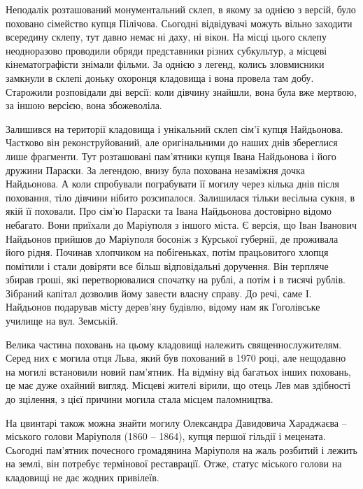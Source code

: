 
Неподалік розташований монументальний склеп, в якому за однією з версій, було
поховано сімейство купця Пілічова. Сьогодні відвідувачі можуть вільно заходити
всередину склепу, тут давно немає ні даху, ні вікон. На місці цього склепу
неодноразово проводили обряди представники різних субкультур, а місцеві
кінематографісти знімали фільми. За однією з легенд, колись зловмисники
замкнули в склепі доньку охоронця кладовища і вона провела там добу. Старожили
розповідали дві версії: коли дівчину знайшли, вона була вже мертвою, за іншою
версією, вона збожеволіла.


Залишився на території кладовища і унікальний склеп сім'ї купця Найдьонова.
Частково він реконструйований, але оригінальними до наших днів збереглися лише
фрагменти. Тут розташовані пам'ятники купця Івана Найдьонова і його дружини
Параски. За легендою, внизу була похована незаміжня дочка Найдьонова. А коли
спробували пограбувати її могилу через кілька днів після поховання, тіло
дівчини нібито розсипалося. Залишилася тільки весільна сукня, в якій її
поховали. Про сім'ю Параски та Івана Найдьонова достовірно відомо небагато.
Вони приїхали до Маріуполя з іншого міста. Є версія, що Іван Іванович Найдьонов
прийшов до Маріуполя босоніж з Курської губернії, де проживала його рідня.
Починав хлопчиком на побігеньках, потім працьовитого хлопця помітили і стали
довіряти все більш відповідальні доручення. Він терпляче збирав гроші, які
перетворювалися спочатку на рублі, а потім і в тисячі рублів. Зібраний капітал
дозволив йому завести власну справу. До речі, саме І. Найдьонов подарував місту
дерев'яну будівлю, відому нам як Гоголівське училище на вул. Земській.


Велика частина поховань на цьому кладовищі належить священнослужителям. Серед
них є могила отця Льва, який був похований в 1970 році, але нещодавно на могилі
встановили новий пам'ятник. На відміну від багатьох інших поховань, це має
дуже охайний вигляд. Місцеві жителі вірили, що отець Лев мав здібності до
зцілення, з цієї причини могила стала місцем паломництва.


На цвинтарі також можна знайти могилу Олександра Давидовича Хараджаєва –
міського голови Маріуполя (1860 – 1864), купця першої гільдії і мецената.
Сьогодні пам'ятник почесного громадянина Маріуполя на жаль розбитий і лежить на
землі, він потребує термінової реставрації. Отже, статус міського голови на
кладовищі не дає жодних привілеїв.


